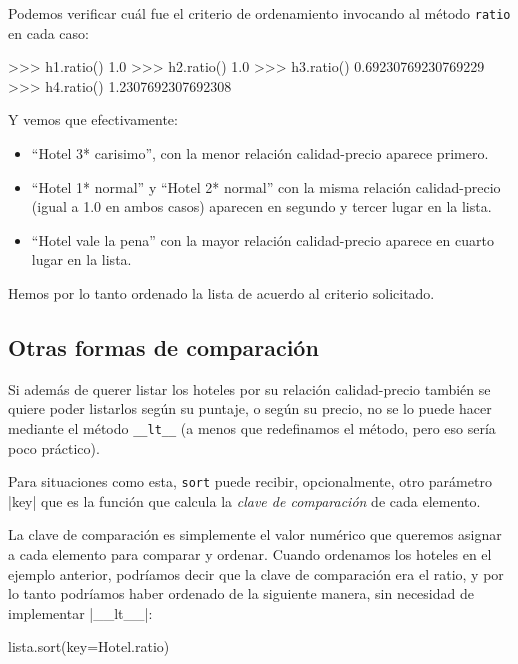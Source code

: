 Podemos verificar cuál fue el criterio de ordenamiento invocando al
método \lstinline!ratio! en cada caso:

\begin{codigo-python-sn}
>>> h1.ratio()
1.0
>>> h2.ratio()
1.0
>>> h3.ratio()
0.69230769230769229
>>> h4.ratio()
1.2307692307692308
\end{codigo-python-sn}

Y vemos que efectivamente:

\begin{itemize}
\item ``Hotel 3* carisimo'', con la menor relación calidad-precio
aparece primero.

\item ``Hotel 1* normal'' y ``Hotel 2* normal'' con la misma relación
calidad-precio (igual a 1.0 en ambos casos) aparecen en segundo
y tercer lugar en la lista.

\item ``Hotel vale la pena'' con la mayor relación calidad-precio
aparece en cuarto lugar en la lista.
\end{itemize}

Hemos por lo tanto ordenado la lista de acuerdo al criterio solicitado.

\subsection{Otras formas de comparación}

Si además de querer listar los hoteles por su relación calidad-precio
también se quiere poder listarlos según su puntaje, o según su precio, no
se lo puede hacer mediante el método \lstinline!__lt__! (a menos que
redefinamos el método, pero eso sería poco práctico).

Para situaciones como esta, \lstinline!sort! puede recibir, opcionalmente,
otro parámetro |key| que es la función que calcula la \emph{clave de comparación}
de cada elemento.

La clave de comparación es simplemente el valor numérico que queremos asignar a
cada elemento para comparar y ordenar. Cuando ordenamos los hoteles en el
ejemplo anterior, podríamos decir que la clave de comparación era el ratio, y
por lo tanto podríamos haber ordenado de la siguiente manera, sin necesidad de
implementar |__lt__|:

\begin{codigo-python-sn}
lista.sort(key=Hotel.ratio)
\end{codigo-python-sn}

